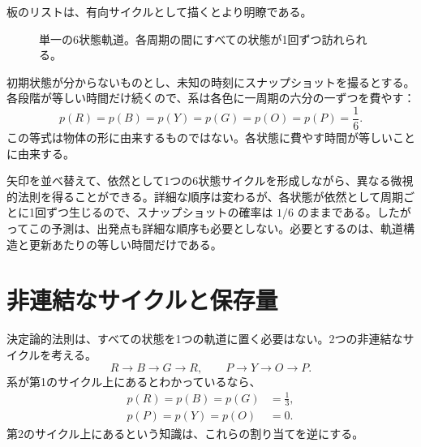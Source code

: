 板のリストは、有向サイクルとして描くとより明瞭である。
\begin{figure}[htbp]
\centering
{}
\caption{単一の6状態軌道。各周期の間にすべての状態が1回ずつ訪れられる。}
\label{fig:sm1-six-cycle}
\end{figure}

初期状態が分からないものとし、未知の時刻にスナップショットを撮るとする。各段階が等しい時間だけ続くので、系は各色に一周期の六分の一ずつを費やす：
\begin{equation}
 p(R)=p(B)=p(Y)=p(G)=p(O)=p(P)=\frac16.
 \label{eq:sm1-uniform-cycle}
\end{equation}
この等式は物体の形に由来するものではない。各状態に費やす時間が等しいことに由来する。

矢印を並べ替えて、依然として1つの6状態サイクルを形成しながら、異なる微視的法則を得ることができる。詳細な順序は変わるが、各状態が依然として周期ごとに1回ずつ生じるので、スナップショットの確率は \(1/6\) のままである。したがってこの予測は、出発点も詳細な順序も必要としない。必要とするのは、軌道構造と更新あたりの等しい時間だけである。

\begin{classroomqa}
\end{classroomqa}

\section{非連結なサイクルと保存量}

決定論的法則は、すべての状態を1つの軌道に置く必要はない。2つの非連結なサイクルを考える。
\begin{equation}
 R\longrightarrow B\longrightarrow G\longrightarrow R,
 \qquad
 P\longrightarrow Y\longrightarrow O\longrightarrow P.
 \label{eq:sm1-two-cycles}
\end{equation}
系が第1のサイクル上にあるとわかっているなら、
\begin{equation}
 \begin{aligned}
 p(R)=p(B)=p(G)&=\frac13,\\
 p(P)=p(Y)=p(O)&=0.
 \end{aligned}
\end{equation}
第2のサイクル上にあるという知識は、これらの割り当てを逆にする。

